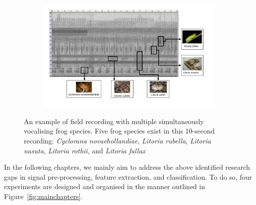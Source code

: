 \begin{figure}[htb!]
\centering
    \begin{subfigure}[b]{\textwidth}
           \includegraphics[width=1\textwidth]{image/LR/label.pdf}
    \end{subfigure}%
\caption[An example of field recording]{An example of field recording with multiple simultaneously vocalising frog species. Five frog species exist in this 10-second recording: \textit{Cyclorana novaehollandiae}, \textit{Litoria rubella}, \textit{Litoria nasuta}, \textit{Litoria rothii}, and \textit{Litoria fallax}}
\label{fig:label}       
\end{figure}


In the following chapters, we mainly aim to address the above identified research gaps in signal pre-processing, feature extraction, and classification. To do so, four experiments are designed and organised in the manner outlined in Figure~\ref{fig:mainchapters}.


